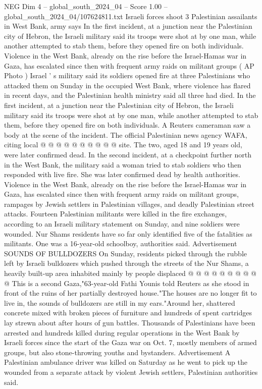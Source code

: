 \begin{textsample}{NEG Dim 4 – global\_south\_2024\_04 – Score 1.00 – global\_south\_2024\_04/107624811.txt}  \label{ex:f4_neg_200}
Israeli forces shoot 3 Palestinian assailants in West Bank, army says In the first incident, at a junction near the Palestinian city of Hebron, the Israeli military said its troops were shot at by one man, while another attempted to stab them, before they opened fire on both individuals.
Violence in the West Bank, already on the rise before the Israel-Hamas war in Gaza, has escalated since then with frequent army raids on militant groups ( AP Photo ) Israel ' s military said its soldiers opened fire at three Palestinians who attacked them on Sunday in the occupied West Bank, where violence has flared in recent days, and the Palestinian health ministry said all three had died.
In the first incident, at a junction near the Palestinian city of Hebron, the Israeli military said its troops were shot at by one man, while another attempted to stab them, before they opened fire on both individuals.
A Reuters cameraman saw a body at the scene of the incident.
The official Palestinian news agency WAFA, citing local @ @ @ @ @ @ @ @ @ @ site.
The two, aged 18 and 19 years old, were later confirmed dead.
In the second incident, at a checkpoint further north in the West Bank, the military said a woman tried to stab soldiers who then responded with live fire.
She was later confirmed dead by health authorities.
Violence in the West Bank, already on the rise before the Israel-Hamas war in Gaza, has escalated since then with frequent army raids on militant groups, rampages by Jewish settlers in Palestinian villages, and deadly Palestinian street attacks.
Fourteen Palestinian militants were killed in the fire exchanges, according to an Israeli military statement on Sunday, and nine soldiers were wounded.
Nur Shams residents have so far only identified five of the fatalities as militants.
One was a 16-year-old schoolboy, authorities said.
Advertisement SOUNDS OF BULLDOZERS On Sunday, residents picked through the rubble left by Israeli bulldozers which pushed through the streets of the Nur Shams, a heavily built-up area inhabited mainly by people displaced @ @ @ @ @ @ @ @ @ @ This is a second Gaza,"63-year-old Fathi Younis told Reuters as she stood in front of the ruins of her partially destroyed house."The houses are no longer fit to live in, the sounds of bulldozers are still in my ears."Around her, shattered concrete mixed with broken pieces of furniture and hundreds of spent cartridges lay strewn about after hours of gun battles.
Thousands of Palestinians have been arrested and hundreds killed during regular operations in the West Bank by Israeli forces since the start of the Gaza war on Oct. 7, mostly members of armed groups, but also stone-throwing youths and bystanders.
Advertisement A Palestinian ambulance driver was killed on Saturday as he went to pick up the wounded from a separate attack by violent Jewish settlers, Palestinian authorities said.

\end{textsample}
